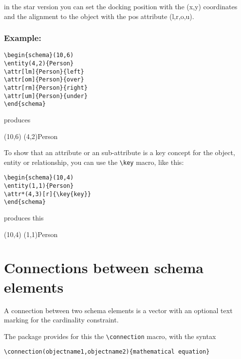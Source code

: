 \documentclass[a4paper,11pt]{article}
\begin{document}
in the star version you can set the docking position with the (x,y) coordinates
and the alignment to the object with the pos attribute (l,r,o,u).

\subsubsection*{Example:}

\begin{verbatim}
\begin{schema}(10,6)
\entity(4,2){Person}
\attr[lm]{Person}{left}
\attr[om]{Person}{over}
\attr[rm]{Person}{right}
\attr[um]{Person}{under}
\end{schema}
\end{verbatim}

produces

\begin{schema}(10,6)
\entity(4,2){Person}
\end{schema}

To show that an attribute or an sub-attribute is a key concept for the object, entity or relationship,
you can use the \verb|\key| macro, like this:

\begin{verbatim}
\begin{schema}(10,4)
\entity(1,1){Person}
\attr*(4,3)[r]{\key{key}}
\end{schema}
\end{verbatim}

produces this

\begin{schema}(10,4)
\entity(1,1){Person}
\end{schema}

\section{Connections between schema elements}

A connection between two schema elements is a vector with an optional
text marking for the cardinality constraint.

The package provides for this the \verb|\connection| macro, with the syntax

\begin{verbatim}
\connection(objectname1,objectname2){mathematical equation}
\end{verbatim}
\end{document}
